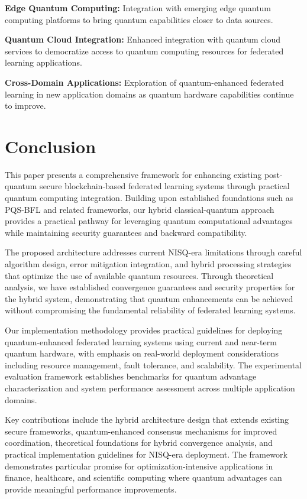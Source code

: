 \documentclass[10pt,journal,compsoc]{IEEEtran}
\begin{document}
\textbf{Edge Quantum Computing:} Integration with emerging edge quantum computing platforms to bring quantum capabilities closer to data sources.

\textbf{Quantum Cloud Integration:} Enhanced integration with quantum cloud services to democratize access to quantum computing resources for federated learning applications.

\textbf{Cross-Domain Applications:} Exploration of quantum-enhanced federated learning in new application domains as quantum hardware capabilities continue to improve.

\section{Conclusion}

This paper presents a comprehensive framework for enhancing existing post-quantum secure blockchain-based federated learning systems through practical quantum computing integration. Building upon established foundations such as PQS-BFL and related frameworks, our hybrid classical-quantum approach provides a practical pathway for leveraging quantum computational advantages while maintaining security guarantees and backward compatibility.

The proposed architecture addresses current NISQ-era limitations through careful algorithm design, error mitigation integration, and hybrid processing strategies that optimize the use of available quantum resources. Through theoretical analysis, we have established convergence guarantees and security properties for the hybrid system, demonstrating that quantum enhancements can be achieved without compromising the fundamental reliability of federated learning systems.

Our implementation methodology provides practical guidelines for deploying quantum-enhanced federated learning systems using current and near-term quantum hardware, with emphasis on real-world deployment considerations including resource management, fault tolerance, and scalability. The experimental evaluation framework establishes benchmarks for quantum advantage characterization and system performance assessment across multiple application domains.

Key contributions include the hybrid architecture design that extends existing secure frameworks, quantum-enhanced consensus mechanisms for improved coordination, theoretical foundations for hybrid convergence analysis, and practical implementation guidelines for NISQ-era deployment. The framework demonstrates particular promise for optimization-intensive applications in finance, healthcare, and scientific computing where quantum advantages can provide meaningful performance improvements.
\end{document}
